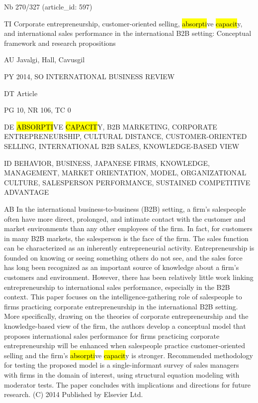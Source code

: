 \documentclass[a4paper]{article}
\begin{document}
\vspace*{-2cm}
Nb \tabto{0cm}270/327 (article\_id: 597)\par
TI \tabto{0cm}Corporate entrepreneurship, customer-oriented selling, \hl{absorpti}ve \hl{capacit}y, and international sales performance in the international B2B setting: Conceptual framework and research propositions\par
AU \tabto{0cm}Javalgi, Hall, Cavusgil\par
PY \tabto{0cm}2014, SO INTERNATIONAL BUSINESS REVIEW\par
DT \tabto{0cm}Article\par
PG \tabto{0cm}10, NR 106, TC 0\par
DE \tabto{0cm}\hl{ABSORPTI}VE \hl{CAPACIT}Y, B2B MARKETING, CORPORATE ENTREPRENEURSHIP, CULTURAL DISTANCE, CUSTOMER-ORIENTED SELLING, INTERNATIONAL B2B SALES, KNOWLEDGE-BASED VIEW\par
ID \tabto{0cm}BEHAVIOR, BUSINESS, JAPANESE FIRMS, KNOWLEDGE, MANAGEMENT, MARKET ORIENTATION, MODEL, ORGANIZATIONAL CULTURE, SALESPERSON PERFORMANCE, SUSTAINED COMPETITIVE ADVANTAGE\par
AB \tabto{0cm}In the international business-to-business (B2B) setting, a firm's salespeople often have more direct, prolonged, and intimate contact with the customer and market environments than any other employees of the firm. In fact, for customers in many B2B markets, the salesperson is the face of the firm. The sales function can be characterized as an inherently entrepreneurial activity. Entrepreneurship is founded on knowing or seeing something others do not see, and the sales force has long been recognized as an important source of knowledge about a firm's customers and environment. However, there has been relatively little work linking entrepreneurship to international sales performance, especially in the B2B context.
This paper focuses on the intelligence-gathering role of salespeople to firms practicing corporate entrepreneurship in the international B2B setting. More specifically, drawing on the theories of corporate entrepreneurship and the knowledge-based view of the firm, the authors develop a conceptual model that proposes international sales performance for firms practicing corporate entrepreneurship will be enhanced when salespeople practice customer-oriented selling and the firm's \hl{absorpti}ve \hl{capacit}y is stronger. Recommended methodology for testing the proposed model is a single-informant survey of sales managers with firms in the domain of interest, using structural equation modeling with moderator tests. The paper concludes with implications and directions for future research. (C) 2014 Published by Elsevier Ltd.\par
\clearpage
\end{document}
